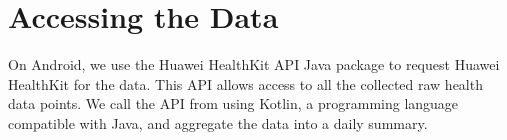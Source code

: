 \section{Accessing the Data}

On Android, we use the Huawei HealthKit API Java package to request
Huawei HealthKit for the data.
This API allows access to all the collected raw health data points.
We call the API from using Kotlin,
a programming language compatible with Java,
and aggregate the data into a daily summary.

